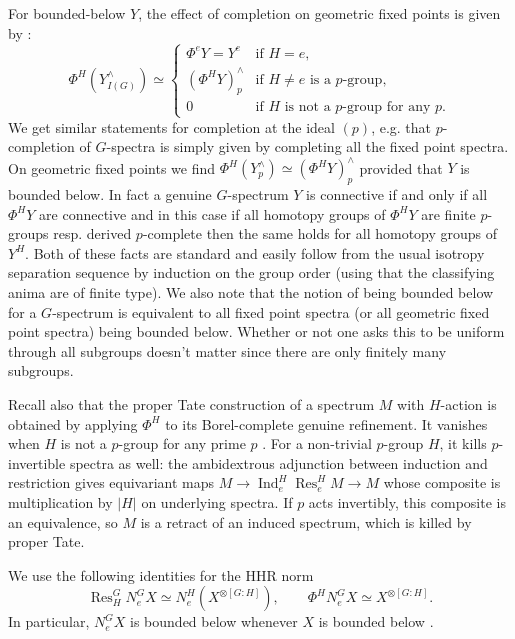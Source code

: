 \documentclass[11pt,a4paper]{article}
\theoremstyle{definition}
\newcommand{\Res}{\operatorname{Res}}
\newcommand{\Ind}{\operatorname{Ind}}
\newcommand{\NormG}{N_e^G}
\begin{document}
For bounded-below $Y$, the effect of completion on geometric fixed points is
given by \cite[Theorem 4.1 and Lemma 5.4]{Rag}:
\begin{equation}\label{eq:marks}
 \Phi^H(Y^\wedge_{I(G)})\simeq
 \begin{cases}
  \Phi^eY = Y^e &\text{if } H=e,\\
  (\Phi^HY)^\wedge_p &\text{if }H\ne e\text{ is a }p\text{-group},\\
  0&\text{if } H\text{ is not a }p\text{-group for any }p.
 \end{cases}
\end{equation}
We get similar statements for completion at the ideal $(p)$, e.g. that $p$-completion of $G$-spectra is  simply given by completing all the fixed point spectra. On geometric fixed points we find
$\Phi^H(Y^\wedge_p)\simeq(\Phi^HY)^\wedge_p$ provided that $Y$ is bounded below. 
In fact a genuine $G$-spectrum $Y$ is connective if and only if all
$\Phi^H Y$ are connective and in this case if all homotopy groups of  $\Phi^H Y$ are finite $p$-groups resp. derived $p$-complete then
the same holds for all homotopy groups of $Y^H$. Both of these facts are standard and easily follow from the usual isotropy separation sequence by induction on the group order (using that the classifying anima are of finite type). We also note that the notion of being bounded below for a $G$-spectrum is equivalent to all fixed point spectra (or all geometric fixed point spectra) being bounded below. Whether or not one asks this to be uniform through all subgroups doesn't matter since there are only finitely many subgroups. 


Recall also that the proper Tate construction of a spectrum $M$ with $H$-action
is obtained by applying $\Phi^H$ to its Borel-complete genuine refinement.
It vanishes when $H$ is not a $p$-group for any prime $p$
\cite[Proposition 7.7]{Nik}. For a non-trivial $p$-group $H$, it kills
$p$-invertible spectra as well: the ambidextrous adjunction between induction and restriction gives
equivariant maps $M\to\Ind_e^H\Res_e^H M\to M$ whose composite is multiplication by
$|H|$ on underlying spectra. If $p$ acts invertibly, this composite is an
equivalence, so $M$ is a retract of an induced spectrum, which is killed by proper Tate.

We use the following identities for the HHR norm \cite[Proposition 2.1]{BR}
\begin{equation}\label{eq:norm}
 \Res_H^G\NormG X\simeq N_e^H(X^{\otimes[G:H]}),
 \qquad \Phi^H\NormG X\simeq X^{\otimes[G:H]}.
\end{equation}
In particular, $\NormG X$ is bounded below whenever $X$ is bounded below
\cite[Lemma 6.3]{BR}.
\end{document}
